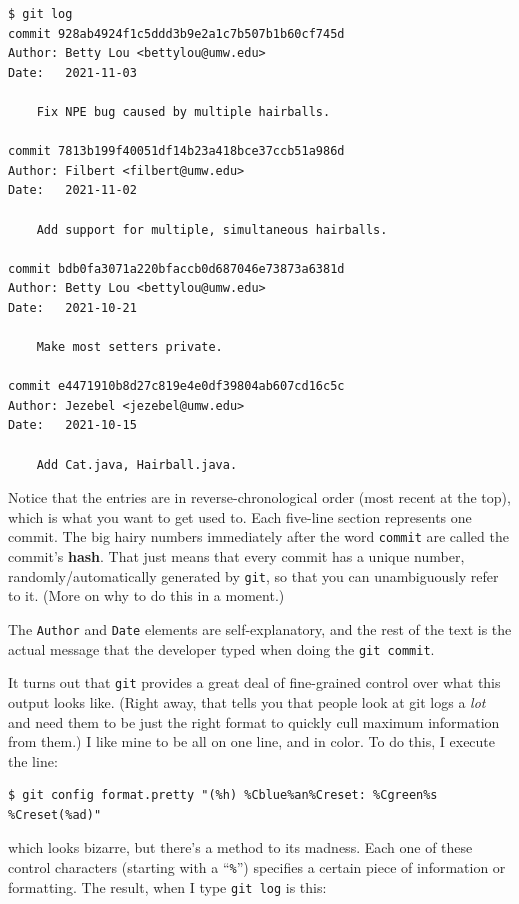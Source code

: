\label{gitLogOutput}
\begin{Verbatim}[fontsize=\footnotesize,samepage=true,frame=single]
$ git log
commit 928ab4924f1c5ddd3b9e2a1c7b507b1b60cf745d
Author: Betty Lou <bettylou@umw.edu>
Date:   2021-11-03

    Fix NPE bug caused by multiple hairballs.

commit 7813b199f40051df14b23a418bce37ccb51a986d
Author: Filbert <filbert@umw.edu>
Date:   2021-11-02

    Add support for multiple, simultaneous hairballs.

commit bdb0fa3071a220bfaccb0d687046e73873a6381d
Author: Betty Lou <bettylou@umw.edu>
Date:   2021-10-21

    Make most setters private.

commit e4471910b8d27c819e4e0df39804ab607cd16c5c
Author: Jezebel <jezebel@umw.edu>
Date:   2021-10-15

    Add Cat.java, Hairball.java.
\end{Verbatim}

Notice that the entries are in reverse-chronological order (most recent at the
top), which is what you want to get used to. Each five-line section represents
one commit. The big hairy numbers immediately after the word \texttt{commit}
are called the commit's \textbf{hash}. That just means that every commit has a
unique number, randomly/automatically generated by \texttt{git}, so that you
can unambiguously refer to it. (More on why to do this in a moment.)

The \texttt{Author} and \texttt{Date} elements are self-explanatory, and the
rest of the text is the actual message that the developer typed when doing the
\texttt{git commit}.

It turns out that \texttt{git} provides a great deal of fine-grained control
over what this output looks like. (Right away, that tells you that people look
at git logs a \textit{lot} and need them to be just the right format to
quickly cull maximum information from them.) I like mine to be all on one
line, and in color. To do this, I execute the line:

\begin{Verbatim}[fontsize=\scriptsize,samepage=true,frame=none]
$ git config format.pretty "(%h) %Cblue%an%Creset: %Cgreen%s %Creset(%ad)"
\end{Verbatim}

which looks bizarre, but there's a method to its madness. Each one of these
control characters (starting with a ``\texttt{\%}'') specifies a certain piece
of information or formatting. The result, when I type \texttt{git log} is
this:

